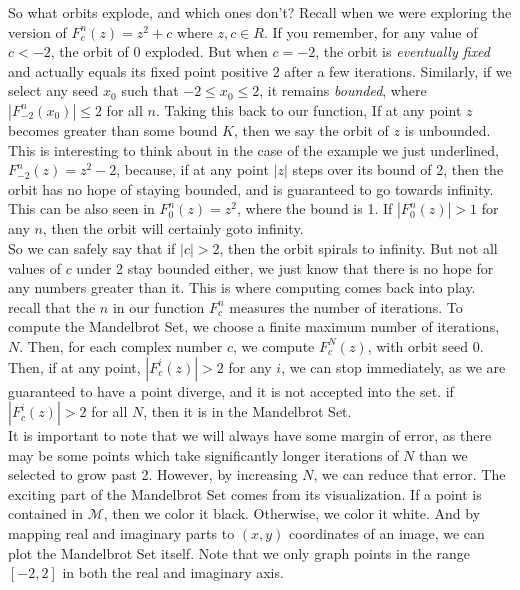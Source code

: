 \documentclass[20pt]{article} %
\begin{document}
So what orbits explode, and which ones don't? Recall when we were exploring the version of $F_c^{n}(z)=z^{2}+c$ where $z,c\in \!R$.  If you remember, for any value of $c < -2$, the orbit of 0 exploded. But when $c=-2$, the orbit is \textit{eventually fixed} and actually equals its fixed point positive 2 after a few iterations. Similarly, if we select any seed $x_0$ such that $-2 \leq x_0 \leq 2$, it remains \textit{bounded}, where $|F_{-2}^{n}(x_0)| \leq 2$ for all $n$.  Taking this back to our function, If at any point $z$ becomes greater than some bound $K$, then we say the orbit of $z$ is unbounded.  This is interesting to think about in the case of the example we just underlined, $F_{-2}^{n}(z)=z^{2}-2$, because, if at any point $|z|$ steps over its bound of 2, then the orbit has no hope of staying bounded, and is guaranteed to go towards infinity.  This can be also seen in $F_0^{n}(z)=z^{2}$, where the bound is 1.  If $|F_0^{n}(z)| > 1$ for any $n$, then the orbit will certainly goto infinity. \\

So we can safely say that if $|c|>2$, then the orbit spirals to infinity.  But not all values of $c$ under 2 stay bounded either, we just know that there is no hope for any numbers greater than it. This is where computing comes back into play.  recall that the $n$ in our function $F_c^{n}$ measures the number of iterations.  To compute the Mandelbrot Set, we choose a finite maximum number of iterations, $N$.  Then, for each complex number $c$, we compute $F_c^{N}(z)$, with orbit seed 0.  Then, if at any point, $|F_c^{i}(z)| > 2$ for any $i$, we can stop immediately, as we are guaranteed to have a point diverge, and it is not accepted into the set.  if $|F_c^{i}(z)| > 2$ for all $N$, then it is in the Mandelbrot Set. \\ 

It is important to note that we will always have some margin of error, as there may be some points which take significantly longer iterations of $N$ than we selected to grow past 2. However, by increasing $N$, we can reduce that error.  The exciting part of the Mandelbrot Set comes from its visualization.  If a point is contained in $\mathcal{M}$, then we color it black. Otherwise, we color it white.  And by mapping real and imaginary parts to $(x,y)$ coordinates of an image, we can plot the Mandelbrot Set itself.  Note that we only graph points in the range $[-2,2]$ in both the real and imaginary axis.
\end{document}
